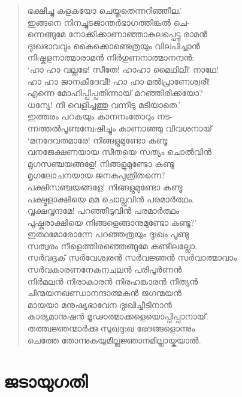 \begin{verse}
ഭക്ഷിച്ചു കളകയോ ചെയ്തതെന്നറിഞ്ഞീല.’\\
ഇങ്ങനെ നിനച്ചുടജാന്തര്‍ഭാഗത്തിങ്കല്‍ ചെ-\\
ന്നെങ്ങുമേ നോക്കിക്കാണാഞ്ഞാകുലപ്പെട്ടു രാമന്‍\\
ദുഃഖഭാവവും കൈക്കൊണ്ടെത്രയും വിലപിച്ചാന്‍\\
നിഷ്കളനാത്മാരാമന്‍ നിര്‍ഗുണനാത്മാനന്ദന്‍:\\
‘ഹാ ഹാ വല്ലഭേ! സീതേ! ഹാഹാ മൈഥിലീ! നാഥേ!\\
ഹാ ഹാ ജാനകീദേവീ! ഹാ ഹാ മല്‍പ്രാണേശ്വരീ!\\
എന്നെ മോഹിപ്പിപ്പതിന്നായ് മറഞ്ഞിരിക്കയോ?\\
ധന്യേ! നീ വെളിച്ചത്തു വന്നീടു മടിയാതെ.’\\
ഇത്തരം പറകയും കാനനംതോറും നട-\\
ന്നത്തല്‍പൂണ്ടന്വേഷിച്ചും കാണാഞ്ഞു വിവശനായ്\\
‘മനദേവതമാരേ! നിങ്ങളുമുണ്ടോ കണ്ടൂ\\
വനജേക്ഷണയായ സീതയെ സത്യം ചൊല്‍വിന്‍\\
മൃഗസഞ്ചയങ്ങളേ! നിങ്ങളുമുണ്ടോ കണ്ടു\\
മൃഗലോചനയായ ജനകപുത്രിതന്നെ?\\
പക്ഷിസഞ്ചയങ്ങളേ! നിങ്ങളുമുണ്ടോ കണ്ടൂ\\
പക്ഷ്മളാക്ഷിയെ മമ ചൊല്ലുവിന്‍ പരമാര്‍ത്ഥം.\\
വൃക്ഷവൃന്ദമേ! പറഞ്ഞീടുവിന്‍ പരമാര്‍ത്ഥം\\
പുഷ്കരാക്ഷിയെ നിങ്ങളെങ്ങാനുമുണ്ടോ കണ്ടൂ?’\\
ഇത്ഥമോരോന്നേ പറഞ്ഞത്രയും ദുഃഖം പൂണ്ടു\\
സത്വരം നീളെത്തിരഞ്ഞെങ്ങുമേ കണ്ടീലല്ലോ.\\
സര്‍വദൃക് സര്‍വേശ്വരന്‍ സര്‍വജ്ഞന്‍ സര്‍വാത്മാവാം\\
സര്‍വകാരണനേകനചലന്‍ പരിപൂര്‍ണന്‍\\
നിര്‍മലന്‍ നിരാകാരന്‍ നിരഹങ്കാരന്‍ നിത്യന്‍\\
ചിന്മയനഖണ്ഡാനന്ദാത്മകന്‍ ജഗന്മയന്‍\\
മായയാ മനുഷ്യഭാവേന ദുഃഖിച്ചീടിനാന്‍\\
കാര്യമാനുഷന്‍ മൂഢാത്മാക്കളെയൊപ്പിപ്പാനായ്.\\
തത്ത്വജ്ഞന്മാര്‍ക്കു സുഖദുഃഖ ഭേദങ്ങളൊന്നും\\
ചെത്തേ തോന്നുകയുമില്ലജ്ഞാനമില്ലായ്കയാല്‍.
\end{verse}

\section{ജടായുഗതി}

